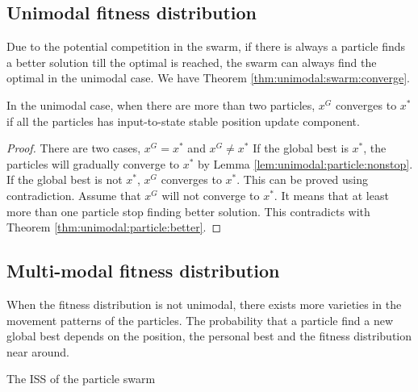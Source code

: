 \subsection{Unimodal fitness distribution}

Due to the potential competition in the swarm, if there is always a particle finds a better solution till the optimal is reached, the swarm can always find the optimal in the unimodal case.
We have Theorem \ref{thm:unimodal:swarm:converge}.

\begin{mythm}
\label{thm:unimodal:swarm:converge}
In the unimodal case, when there are more than two particles, $ x^{G} $ converges to $ x^{*} $ if all the particles has input-to-state stable position update component.
\begin{proof}
There are two cases, $ x^{G} = x^{*} $ and $ x^{G} \not = x^{*} $
If the global best is $ x^{*} $, the particles will gradually converge to $ x^{*} $ by Lemma \ref{lem:unimodal:particle:nonstop}.
If the global best is not $ x^{*} $, $ x^{G} $ converges to $ x^{*} $.
This can be proved using contradiction.
Assume that $ x^{G} $ will not converge to $ x^{*} $.
It means that at least more than one particle stop finding better solution.
This contradicts with Theorem \ref{thm:unimodal:particle:better}.
\end{proof}
\end{mythm}



\begin{mythm}

\end{mythm}

\subsection{Multi-modal fitness distribution}

When the fitness distribution is not unimodal, there exists more varieties in the movement patterns of the particles.
The probability that a particle find a new global best depends on the position, the personal best and the fitness distribution near around.

\begin{mythm}
The ISS of the particle swarm
\end{mythm}

